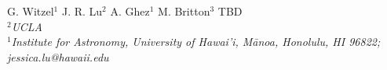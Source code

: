 G. Witzel${}^1$
J. R. Lu${}^2$
A. Ghez${}^1$
M. Britton${}^3$
TBD
\\
${}^2${\em UCLA}
\\
${}^1${\em Institute for Astronomy, University of Hawai'i, M\={a}noa,
    Honolulu, HI 96822; jessica.lu@hawaii.edu}
\\

